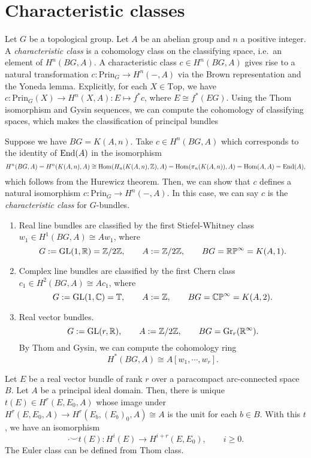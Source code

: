 \documentclass{../../large}
\begin{document}
\section{Characteristic classes}

\begin{prb}
Let $G$ be a topological group.
Let $A$ be an abelian group and $n$ a positive integer.
A \emph{characteristic class} is a cohomology class on the classifying space, i.e.~an element of $H^n(BG,A)$.
A characteristic class $c\in H^n(BG,A)$ gives rise to a natural transformation $c:\mathrm{Prin}_G\to H^n(-,A)$ via the Brown representation and the Yoneda lemma.
Explicitly, for each $X\in\mathrm{Top}$, we have $c:\mathrm{Prin}_G(X)\to H^n(X,A):E\mapsto f^*c$, where $E\cong f^*(EG)$.
Using the Thom isomorphism and Gysin sequences, we can compute the cohomology of classifying spaces, which makes the classification of principal bundles

Suppose we have $BG=K(A,n)$.
Take $c\in H^n(BG,A)$ which corresponds to the identity of $\operatorname{End}(A)$ in the isomorphism
\[H^n(BG,A)=H^n(K(A,n),A)\cong\operatorname{Hom}(H_n(K(A,n),\mathbb{Z}),A)=\operatorname{Hom}(\pi_n(K(A,n)),A)=\operatorname{Hom}(A,A)=\operatorname{End}(A),\]
which follows from the Hurewicz theorem.
Then, we can show that $c$ defines a natural isomorphism $c:\mathrm{Prin}_G\to H^n(-,A)$.
In this case, we can say $c$ is the \emph{characteristic class} for $G$-bundles.
\end{prb}

\begin{enumerate}
\item Real line bundles are classified by the first Stiefel-Whitney class $w_1\in H^1(BG,A)\cong Aw_1$, where
\[G:=\mathrm{GL}(1,\mathbb{R})=\mathbb{Z}/2\mathbb{Z},\qquad A:=\mathbb{Z}/2\mathbb{Z},\qquad BG=\mathbb{RP}^\infty=K(A,1).\]
\item Complex line bundles are classified by the first Chern class $c_1\in H^2(BG,A)\cong Ac_1$, where
\[G:=\mathrm{GL}(1,\mathbb{C})=\mathbb{T},\qquad A:=\mathbb{Z},\qquad BG=\mathbb{CP}^\infty=K(A,2).\]
\item Real vector bundles.
\[G:=\mathrm{GL}(r,\mathbb{R}),\qquad A:=\mathbb{Z}/2\mathbb{Z},\qquad BG=\mathrm{Gr}_r(\mathbb{R}^\infty).\]
By Thom and Gysin, we can compute the cohomology ring
\[H^*(BG,A)\cong A[w_1,\cdots,w_r].\]
\end{enumerate}

\begin{prb}
Let $E$ be a real vector bundle of rank $r$ over a paracompact arc-connected space $B$.
Let $A$ be a principal ideal domain.
Then, there is unique $t(E)\in H^r(E,E_0,A)$ whose image under $H^r(E,E_0,A)\to H^r(E_b,(E_b)_0,A)\cong A$ is the unit for each $b\in B$.
With this $t$, we have an isomorphism
\[\cdot\smile t(E):H^i(E)\to H^{i+r}(E,E_0),\qquad i\ge0.\]
The Euler class can be defined from Thom class.
\end{prb}
\end{document}

